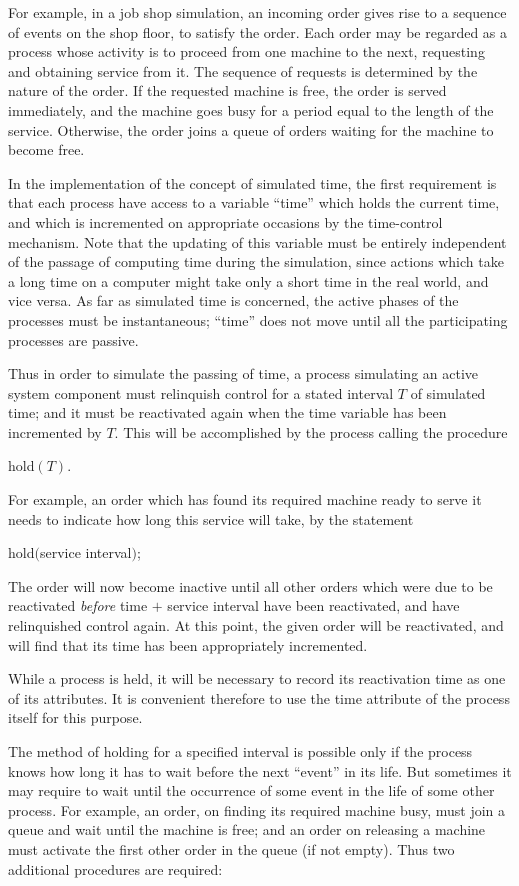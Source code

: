 For example, in a job shop simulation, an incoming order gives rise to a sequence of events on the shop floor, to satisfy the order. Each order may be regarded as a process whose activity is to proceed from one machine to the next, requesting and obtaining service from it. The sequence of requests is determined by the nature of the order. If the requested machine is free, the order is served immediately, and the machine goes busy for a period equal to the length of the service. Otherwise, the order joins a queue of orders waiting for the machine to become free.

In the implementation of the concept of simulated time, the first requirement is that each process have access to a variable ``time'' which holds the current time, and which is incremented on appropriate occasions by the time-control mechanism. Note that the updating of this variable must be entirely independent of the passage of computing time during the simulation, since actions which take a long time on a computer might take only a short time in the real world, and vice versa. As far as simulated time is concerned, the active phases of the processes must be instantaneous; ``time'' does not move until all the participating processes are passive.

Thus in order to simulate the passing of time, a process simulating an active system component must relinquish control for a stated interval $T$ of simulated time; and it must be reactivated again when the time variable has been incremented by $T$. This will be accomplished by the process calling the procedure

\quad hold$(T)$.

For example, an order which has found its required machine ready to serve it needs to indicate how long this service will take, by the statement

\quad hold$($service interval$)$;

\noindent
The order will now become inactive until all other orders which were due to be reactivated \textit{before} time $+$ service interval have been reactivated, and have relinquished control again. At this point, the given order will be reactivated, and will find that its time has been appropriately incremented.

While a process is held, it will be necessary to record its reactivation time as one of its attributes. It is convenient therefore to use the time attribute of the process itself for this purpose.

The method of holding for a specified interval is possible only if the process knows how long it has to wait before the next ``event'' in its life. But sometimes it may require to wait until the occurrence of some event in the life of some other process. For example, an order, on finding its required machine busy, must join a queue and wait until the machine is free; and an order on releasing a machine must activate the first other order in the queue (if not empty). Thus two additional procedures are required:


